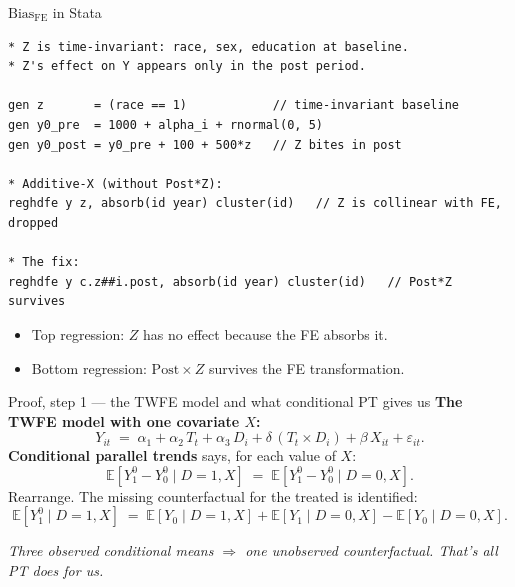 \documentclass[aspectratio=169,11pt]{beamer}
\begin{document}
\begin{frame}[fragile]{$\text{Bias}_{\text{FE}}$ in Stata}
\footnotesize
\begin{lstlisting}[language={[ANSI]C},basicstyle=\ttfamily\scriptsize]
* Z is time-invariant: race, sex, education at baseline.
* Z's effect on Y appears only in the post period.

gen z       = (race == 1)            // time-invariant baseline
gen y0_pre  = 1000 + alpha_i + rnormal(0, 5)
gen y0_post = y0_pre + 100 + 500*z   // Z bites in post

* Additive-X (without Post*Z):
reghdfe y z, absorb(id year) cluster(id)   // Z is collinear with FE, dropped

* The fix:
reghdfe y c.z##i.post, absorb(id year) cluster(id)   // Post*Z survives
\end{lstlisting}

\vspace{0.3em}
\begin{itemize}\setlength\itemsep{2pt}
  \item Top regression: $Z$ has no effect because the FE absorbs it.
  \item Bottom regression: $\text{Post}\times Z$ survives the FE transformation.
\end{itemize}
\end{frame}

\begin{frame}{Proof, step 1 --- the TWFE model and what conditional PT gives us}
\vspace{0.4em}
\textbf{The TWFE model with one covariate $X$:}
\[
Y_{it} \;=\; \alpha_1 + \alpha_2\, T_t + \alpha_3\, D_i + \delta\,(T_t \times D_i) + \beta\, X_{it} + \varepsilon_{it}.
\]
\vspace{0.3em}
\textbf{Conditional parallel trends} says, for each value of $X$:
\[
\mathbb{E}[Y^0_1 - Y^0_0 \mid D{=}1, X] \;=\; \mathbb{E}[Y^0_1 - Y^0_0 \mid D{=}0, X].
\]
\vspace{0.1em}
Rearrange. The missing counterfactual for the treated is identified:
\[
\mathbb{E}[Y^0_1 \mid D{=}1, X] \;=\; \mathbb{E}[Y_0 \mid D{=}1, X] + \mathbb{E}[Y_1 \mid D{=}0, X] - \mathbb{E}[Y_0 \mid D{=}0, X].
\]
\vspace{0.2em}
\begin{center}
\footnotesize\color{warmgray}\itshape
Three observed conditional means $\Rightarrow$ one unobserved counterfactual. \;That's all PT does for us.
\end{center}
\end{frame}
\end{document}
